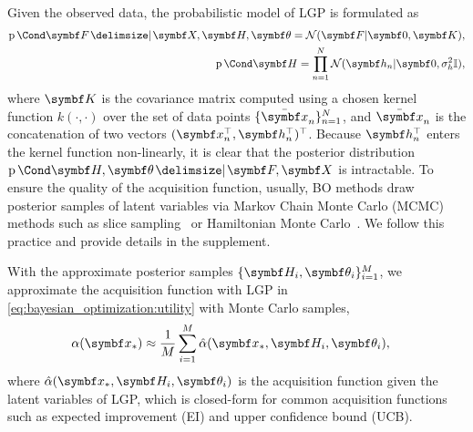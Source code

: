 Given the observed data, the probabilistic model of LGP is formulated as
\begin{align}
    \begin{split}
        \Prob{\mat{F} \given \mat{X}, \mat{H}, \mat{\theta}} = \mathcal{N}(\mat{F} | \mat{0}, \mat{K}),\\
        \Prob{\mat{H}} = \prod_{n=1}^N \mathcal{N}(\mat{h}_n | \mat{0}, \sigma_h^2\mathbb{I}),
    \end{split}
\end{align}
where $\mat{K}$ is the covariance matrix computed using a chosen kernel function $k(\cdot, \cdot)$ over the set of data points $\{\bar{\mat{x}}_n\}_{n=1}^N$, and $\bar{\mat{x}}_n$ is the concatenation of two vectors $(\mat{x}_n^\top, \mat{h}_n^\top)^\top$.
Because $\mat{h}_n^\top$ enters the kernel function non-linearly, it is clear that the posterior distribution $\Prob{\mat{H}, \mat{\theta} \given \mat{F}, \mat{X}}$ is intractable.
To ensure the quality of the acquisition function, usually, BO methods draw posterior samples of latent variables via Markov Chain Monte Carlo (MCMC) methods such as slice sampling~\parencite{snoek_practical_2012} or Hamiltonian Monte Carlo~\parencite{duane_hybrid_1987}.
We follow this practice and provide details in the supplement.

With the approximate posterior samples $\{\mat{H}_i, \mat{\theta}_i\}_{i=1}^M$, we approximate the acquisition function with LGP in \cref{eq:bayesian_optimization:utility} with Monte Carlo samples,
\begin{align}
    \alpha(\mat{x}_\ast) &\approx
    \frac{1}{M}\sum_{i=1}^M \hat{\alpha}(\mat{x}_*, \mat{H}_i, \mat{\theta}_i),
\end{align}
where $\hat{\alpha}(\mat{x}_*, \mat{H}_i, \mat{\theta}_i)$ is the acquisition function given the latent variables of LGP, which is closed-form for common acquisition functions such as expected improvement (EI) and upper confidence bound (UCB).


